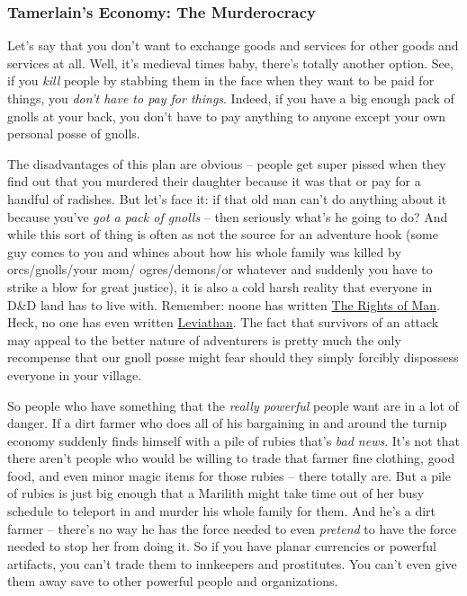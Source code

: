 \subsubsection{Tamerlain's Economy: The Murderocracy}
\vspace*{-8pt}

Let's say that you don't want to exchange goods and services for other goods and services at all. Well, it's medieval times baby, there's totally another option. See, if you \textit{kill} people by stabbing them in the face when they want to be paid for things, you \textit{don't have to pay for things}. Indeed, if you have a big enough pack of gnolls at your back, you don't have to pay anything to anyone except your own personal posse of gnolls.

The disadvantages of this plan are obvious -- people get super pissed when they find out that you murdered their daughter because it was that or pay for a handful of radishes. But let's face it: if that old man can't do anything about it because you've \textit{got a pack of gnolls} -- then seriously what's he going to do? And while this sort of thing is often as not the source for an adventure hook (some guy comes to you and whines about how his whole family was killed by orcs/gnolls/your mom/ ogres/demons/or whatever and suddenly you have to strike a blow for great justice), it is also a cold harsh reality that everyone in D\&D land has to live with. Remember: noone has written \underline{The Rights of Man}. Heck, no one has even written \underline{Leviathan}. The fact that survivors of an attack may appeal to the better nature of adventurers is pretty much the only recompense that our gnoll posse might fear should they simply forcibly dispossess everyone in your village.

So people who have something that the \textit{really powerful} people want are in a lot of danger. If a dirt farmer who does all of his bargaining in and around the turnip economy suddenly finds himself with a pile of rubies that's \textit{bad news}. It's not that there aren't people who would be willing to trade that farmer fine clothing, good food, and even minor magic items for those rubies -- there totally are. But a pile of rubies is just big enough that a Marilith might take time out of her busy schedule to teleport in and murder his whole family for them. And he's a dirt farmer -- there's no way he has the force needed to even \textit{pretend} to have the force needed to stop her from doing it. So if you have planar currencies or powerful artifacts, you can't trade them to innkeepers and prostitutes. You can't even give them away save to other powerful people and organizations.

